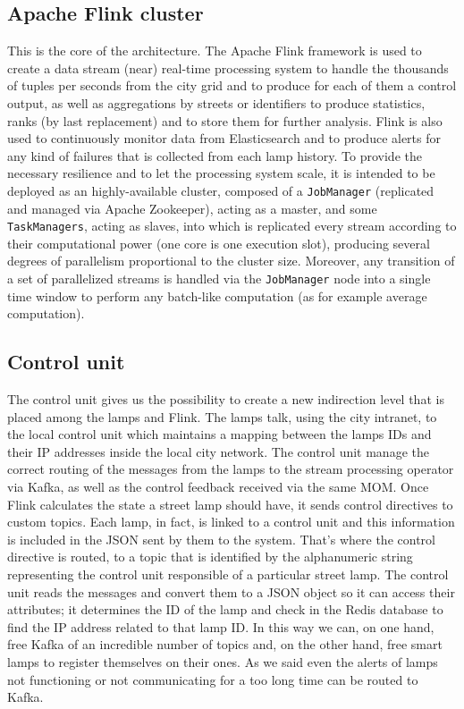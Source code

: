 \subsection{Apache Flink cluster}
This is the core of the architecture. The Apache Flink framework is used to create a data stream (near) real-time processing system to handle the thousands of tuples per seconds from the city grid and to produce for each of them a control output, as well as aggregations by streets or identifiers to produce statistics, ranks (by last replacement) and to store them for further analysis. Flink is also used to continuously monitor data from Elasticsearch and to produce alerts for any kind of failures that is collected from each lamp history. To provide the necessary resilience and to let the processing system scale, it is intended to be deployed as an highly-available cluster, composed of a \texttt{JobManager} (replicated and managed via Apache Zookeeper), acting as a master, and some \texttt{TaskManagers}, acting as slaves, into which is replicated every stream according to their computational power (one core is one execution slot), producing several degrees of parallelism proportional to the cluster size. Moreover, any transition of a set of parallelized streams is handled via the \texttt{JobManager} node into a single time window to perform any batch-like computation (as for example average computation).

\subsection{Control unit}
The control unit gives us the possibility to create a new indirection level that is placed among the lamps and Flink. The lamps talk, using the city intranet, to the local control unit which maintains a mapping between the lamps IDs and their IP addresses inside the local city network. The control unit manage the correct routing of the messages from the lamps to the stream processing operator via Kafka, as well as the control feedback received via the same MOM.
Once Flink calculates the state a street lamp should have, it sends control directives to custom topics. Each lamp, in fact, is linked to a control unit and this information is included in the JSON sent by them to the system. That’s where the control directive is routed, to a topic that is identified by the alphanumeric string representing the control unit responsible of a particular street lamp. The control unit reads the messages and convert them to a JSON object so it can access their attributes; it determines the ID of the lamp and check in the Redis database to find the IP address related to that lamp ID.
In this way we can, on one hand, free Kafka of an incredible number of topics and, on the other hand, free smart lamps to register themselves on their ones. As we said even the alerts of lamps not functioning or not communicating for a too long time can be routed to Kafka. 

